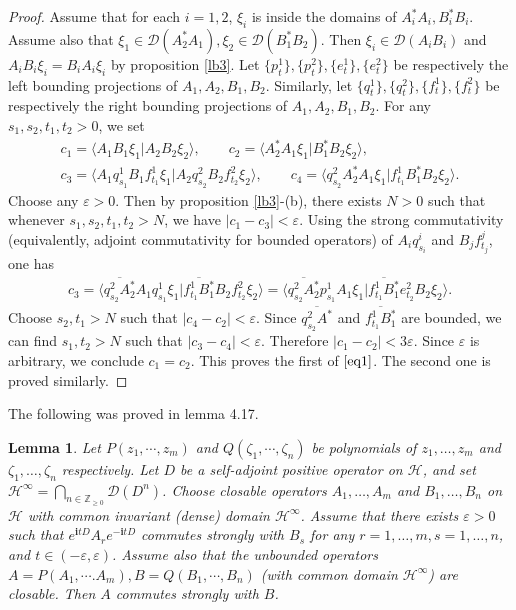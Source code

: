 \documentclass[11pt,b5paper,notitlepage]{article}
\theoremstyle{definition}
\theoremstyle{plain}
\newtheorem{lm}[df]{Lemma}
\newcommand{\mc}{\mathcal}
\newcommand{\ovl}{\overline}
\newcommand{\Dom}{\scr D}
\newcommand{\bk}[1]{\langle {#1}\rangle}
\newcommand{\scr}{\mathscr}
\newcommand{\im}{\mathbf{i}}
\numberwithin{equation}{subsection}
\begin{document}
\begin{subappendices}
\begin{proof}
	Assume that for each $i=1,2$, $\xi_i$ is inside the domains of $A_i^*A_i,B_i^*B_i$. Assume also that $\xi_1\in\Dom(A_2^*A_1),\xi_2\in\Dom(B_1^*B_2)$. Then $\xi_i\in\Dom(A_iB_i)$ and $A_iB_i\xi_i=B_iA_i\xi_i$ by proposition \ref{lb3}. Let $\{p^1_t\},\{p^2_t\},\{e^1_t\},\{e^2_t\}$ be respectively the left bounding projections of $A_1,A_2,B_1,B_2$. Similarly, let $\{q^1_t\},\{q^2_t\},\{f^1_t\},\{f^2_t\}$ be respectively the right bounding projections of $A_1,A_2,B_1,B_2$. For any $s_1,s_2,t_1,t_2>0$, we set
	\begin{gather*}
	c_1=\bk{A_1B_1\xi_1|A_2B_2\xi_2},\qquad c_2=\bk{A_2^*A_1\xi_1|B_1^*B_2\xi_2},\\
	c_3=\bk{A_1q^1_{s_1}B_1f^1_{t_1}\xi_1|A_2q^2_{s_2}B_2f^2_{t_2}\xi_2},\qquad c_4=\bk{q^2_{s_2}A_2^*A_1\xi_1|f^1_{t_1}B_1^*B_2\xi_2}.
	\end{gather*}
	Choose any $\varepsilon>0$. Then by proposition \ref{lb3}-(b), there exists $N>0$ such that whenever $s_1,s_2,t_1,t_2>N$, we have $|c_1-c_3|<\varepsilon$. Using the strong commutativity (equivalently, adjoint commutativity for bounded operators) of $A_iq^i_{s_i}$ and $B_jf^j_{t_j}$, one has
	\begin{align*}
	c_3=\bk{\ovl{q^2_{s_2}A_2^*}A_1q^1_{s_1}\xi_1|\ovl{f^1_{t_1}B_1^*}B_2f^2_{t_2}\xi_2}=\bk{\ovl{q^2_{s_2}A_2^*}p^1_{s_1}A_1\xi_1|\ovl{f^1_{t_1}B_1^*}e^2_{t_2}B_2\xi_2}.
	\end{align*}
	Choose $s_2,t_1>N$ such that $|c_4-c_2|<\varepsilon$. Since $\ovl{q^2_{s_2}A^*}$ and $\ovl{f^1_{t_1}B_1^*}$ are bounded, we can find $s_1,t_2>N$ such that $|c_3-c_4|<\varepsilon$. Therefore $|c_1-c_2|<3\varepsilon$. Since $\varepsilon$ is arbitrary, we conclude $c_1=c_2$. This proves the first of $\eqref{eq1}$. The second one is proved similarly.
\end{proof}

The following was proved in \cite{Gui21a} lemma 4.17.

\begin{lm}\label{lb59}
	Let $P(z_1,\cdots,z_m)$ and $Q(\zeta_1,\cdots,\zeta_n)$ be polynomials of $z_1,\dots,z_m$ and $\zeta_1,\dots,\zeta_n$ respectively. Let $D$ be a self-adjoint positive operator on $\mc H$, and set $\mc H^\infty=\bigcap_{n\in\mathbb Z_{\geq0}}\Dom(D^n)$. Choose  closable operators $A_1,\dots,A_m$ and $B_1,\dots,B_n$   on 
	$\mc H$ with common invariant (dense) domain $\mc H^\infty$. Assume that there exists $\varepsilon>0$ such that   $e^{\im tD}A_re^{-\im tD}$ commutes strongly with $B_s$ for any $r=1,\dots,m,s=1,\dots,n$, and  $t\in(-\varepsilon,\varepsilon)$.  Assume also that the unbounded operators $A=P(A_1,\cdots.A_m),B=Q(B_1,\cdots,B_n)$ (with common domain $\mc H^\infty$) are closable. Then $A$ commutes strongly with $B$.
\end{lm}






\end{subappendices}
\end{document}
